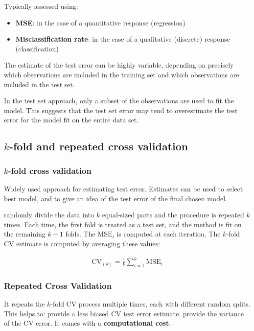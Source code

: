 Typically assessed using:

\begin{itemize}
    \item \textbf{MSE}: in the case of a quantitative response (regression)
    \item \textbf{Misclassification rate}: in the case of a qualitative (discrete) response (classification)
\end{itemize}

The estimate of the test error can be highly variable, depending on precisely which observations are included in the training set and which observations are included in the test set.

In the test set approach, only a subset of the observations are used to fit the model. This suggests that the test set error may tend to overestimate the test error for the model fit on the entire data set.

\subsection{$k$-fold and repeated cross validation}

\subsubsection{$k$-fold cross validation}

\indent 

Widely used approach for estimating test error. Estimates can be used to select best model, and to give an idea of the test error of the final chosen model.

randomly divide the data into $k$ equal-sized parts and the procedure is repeated $k$ times. Each time, the first fold is treated as a test set, and the method is fit on the remaining $k-1$ folds. The $\text{MSE}_i$ is computed at each iteration. The $k$-fold CV estimate is computed by averaging these values:

\begin{align*}
    \text{CV}_{(k)} = \frac{1}{k}\sum_{i=1}^{k}\text{MSE}_i
\end{align*}

\subsubsection{Repeated Cross Validation}

\indent 

It repeats the $k$-fold CV process multiple times, each with different random splits. This helps to: provide a less biased CV test error estimate. provide the variance of the CV error. It comes with a \textbf{computational cost}.

